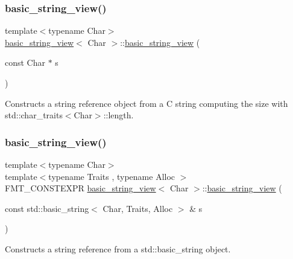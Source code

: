 \subsubsection{\texorpdfstring{basic\+\_\+string\+\_\+view()}{basic\_string\_view()}\hspace{0.1cm}{\footnotesize\ttfamily [2/3]}}
{\footnotesize\ttfamily template$<$typename Char$>$ \\
\hyperlink{classbasic__string__view}{basic\+\_\+string\+\_\+view}$<$ Char $>$\+::\hyperlink{classbasic__string__view}{basic\+\_\+string\+\_\+view} (\begin{DoxyParamCaption}\item[{const Char $\ast$}]{s }\end{DoxyParamCaption})\hspace{0.3cm}{\ttfamily [inline]}}

Constructs a string reference object from a C string computing the size with {\ttfamily std\+::char\+\_\+traits$<$Char$>$\+::length}.  \mbox{\label{classbasic__string__view_a1e4a7e97cbd0ebcd9ca924714d33319c}} 
\subsubsection{\texorpdfstring{basic\+\_\+string\+\_\+view()}{basic\_string\_view()}\hspace{0.1cm}{\footnotesize\ttfamily [3/3]}}
{\footnotesize\ttfamily template$<$typename Char$>$ \\
template$<$typename Traits , typename Alloc $>$ \\
F\+M\+T\+\_\+\+C\+O\+N\+S\+T\+E\+X\+PR \hyperlink{classbasic__string__view}{basic\+\_\+string\+\_\+view}$<$ Char $>$\+::\hyperlink{classbasic__string__view}{basic\+\_\+string\+\_\+view} (\begin{DoxyParamCaption}\item[{const std\+::basic\+\_\+string$<$ Char, Traits, Alloc $>$ \&}]{s }\end{DoxyParamCaption})\hspace{0.3cm}{\ttfamily [inline]}}

Constructs a string reference from a {\ttfamily std\+::basic\+\_\+string} object. 

